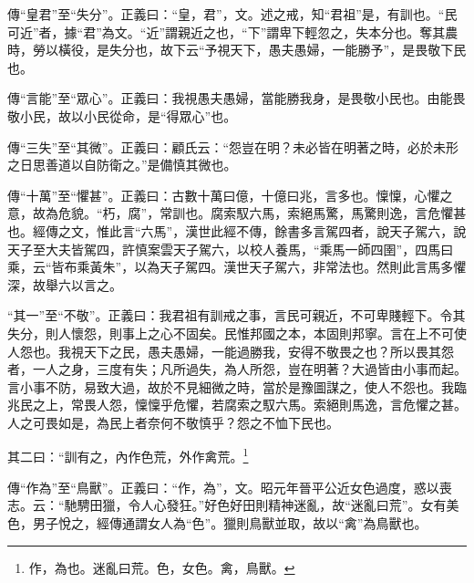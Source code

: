 {\noindent\zhuan{}\fzbyks 傳“皇君”至“失分”。正義曰：“皇，君”，文。述之戒，知“君祖”是，有訓也。“民可近”者，據“君”為文。“近”謂親近之也，“下”謂卑下輕忽之，失本分也。奪其農時，勞以橫役，是失分也，故下云“予視天下，愚夫愚婦，一能勝予”，是畏敬下民也。 \par}

{\noindent\zhuan{}\fzbyks 傳“言能”至“眾心”。正義曰：我視愚夫愚婦，當能勝我身，是畏敬小民也。由能畏敬小民，故以小民從命，是“得眾心”也。 \par}

{\noindent\zhuan{}\fzbyks 傳“三失”至“其微”。正義曰：顧氏云：“怨豈在明？未必皆在明著之時，必於未形之日思善道以自防衛之。”是備慎其微也。 \par}

{\noindent\zhuan{}\fzbyks 傳“十萬”至“懼甚”。正義曰：古數十萬曰億，十億曰兆，言多也。懍懍，心懼之意，故為危貌。“朽，腐”，常訓也。腐索馭六馬，索絕馬驚，馬驚則逸，言危懼甚也。經傳之文，惟此言“六馬”，漢世此經不傳，餘書多言駕四者，說天子駕六，說天子至大夫皆駕四，許慎案雲天子駕六，以校人養馬，“乘馬一師四圉”，四馬曰乘，云“皆布乘黃朱”，以為天子駕四。漢世天子駕六，非常法也。然則此言馬多懼深，故舉六以言之。 \par}

{\noindent\shu{}\fzkt “其一”至“不敬”。正義曰：我君祖有訓戒之事，言民可親近，不可卑賤輕下。令其失分，則人懷怨，則事上之心不固矣。民惟邦國之本，本固則邦寧。言在上不可使人怨也。我視天下之民，愚夫愚婦，一能過勝我，安得不敬畏之也？所以畏其怨者，一人之身，三度有失；凡所過失，為人所怨，豈在明著？大過皆由小事而起。言小事不防，易致大過，故於不見細微之時，當於是豫圖謀之，使人不怨也。我臨兆民之上，常畏人怨，懍懍乎危懼，若腐索之馭六馬。索絕則馬逸，言危懼之甚。人之可畏如是，為民上者奈何不敬慎乎？怨之不恤下民也。 \par}

其二曰：“訓有之，內作色荒，外作禽荒。\footnote{作，為也。迷亂曰荒。色，女色。禽，鳥獸。}

{\noindent\zhuan{}\fzbyks 傳“作為”至“鳥獸”。正義曰：“作，為”，文。昭元年晉平公近女色過度，惑以喪志。云：“馳騁田獵，令人心發狂。”好色好田則精神迷亂，故“迷亂曰荒”。女有美色，男子悅之，經傳通謂女人為“色”。獵則鳥獸並取，故以“禽”為鳥獸也。 \par}

